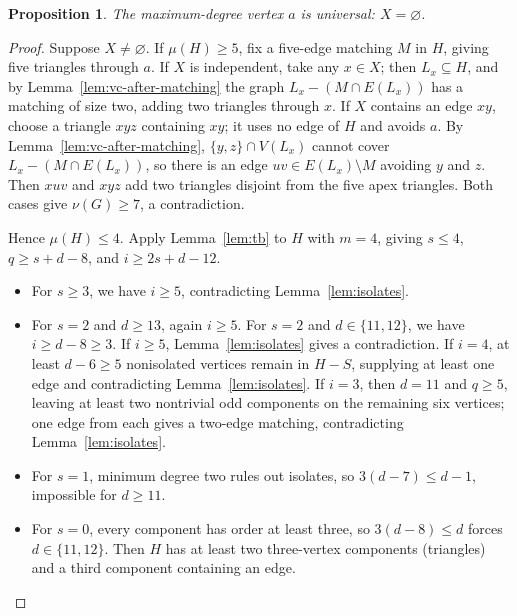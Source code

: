 \documentclass[11pt]{article}
\newtheorem{proposition}[theorem]{Proposition}
\begin{document}
\begin{proposition}\label{prop:universal}
The maximum-degree vertex $a$ is universal: $X=\varnothing$.
\end{proposition}

\begin{proof}
Suppose $X\neq\varnothing$. If $\mu(H)\geq 5$, fix a five-edge matching $M$ in $H$, giving five triangles through $a$. If $X$ is independent, take any $x\in X$; then $L_x\subseteq H$, and by Lemma~\ref{lem:vc-after-matching} the graph $L_x-(M\cap E(L_x))$ has a matching of size two, adding two triangles through $x$. If $X$ contains an edge $xy$, choose a triangle $xyz$ containing $xy$; it uses no edge of $H$ and avoids $a$. By Lemma~\ref{lem:vc-after-matching}, $\{y,z\}\cap V(L_x)$ cannot cover $L_x-(M\cap E(L_x))$, so there is an edge $uv\in E(L_x)\setminus M$ avoiding $y$ and $z$. Then $xuv$ and $xyz$ add two triangles disjoint from the five apex triangles. Both cases give $\nu(G)\geq 7$, a contradiction.

Hence $\mu(H)\leq 4$. Apply Lemma~\ref{lem:tb} to $H$ with $m=4$, giving $s\leq 4$, $q\geq s+d-8$, and $i\geq 2s+d-12$.
\begin{itemize}
\item For $s\geq 3$, we have $i\geq 5$, contradicting Lemma~\ref{lem:isolates}.
\item For $s=2$ and $d\geq 13$, again $i\geq 5$. For $s=2$ and $d\in\{11,12\}$, we have $i\geq d-8\geq 3$. If $i\geq 5$, Lemma~\ref{lem:isolates} gives a contradiction. If $i=4$, at least $d-6\geq 5$ nonisolated vertices remain in $H-S$, supplying at least one edge and contradicting Lemma~\ref{lem:isolates}. If $i=3$, then $d=11$ and $q\geq 5$, leaving at least two nontrivial odd components on the remaining six vertices; one edge from each gives a two-edge matching, contradicting Lemma~\ref{lem:isolates}.
\item For $s=1$, minimum degree two rules out isolates, so $3(d-7)\leq d-1$, impossible for $d\geq 11$.
\item For $s=0$, every component has order at least three, so $3(d-8)\leq d$ forces $d\in\{11,12\}$. Then $H$ has at least two three-vertex components (triangles) and a third component containing an edge.
\end{itemize}


\end{proof}
\end{document}
